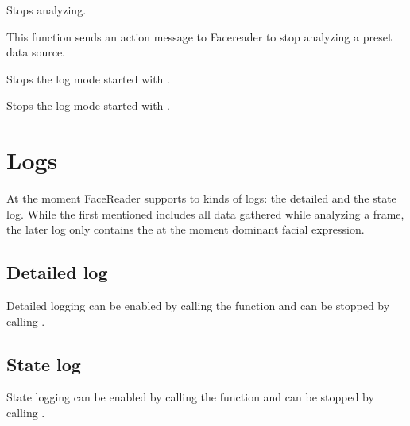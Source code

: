 \documentclass[letterpaper,10pt,english]{sphinxmanual}
\begin{document}
\begin{fulllineitems}

\begin{fulllineitems}
\label{_static/code:FaceReader.FaceReader.stop_analyzing}
Stops analyzing.

This function sends an action message to Facereader to stop analyzing a preset data source.

\end{fulllineitems}


\begin{fulllineitems}
\label{_static/code:FaceReader.FaceReader.stop_detailed_log}
Stops the log mode started with {\hyperref[_static/code:FaceReader.FaceReader.start_detailed_log]{}}.

\end{fulllineitems}


\begin{fulllineitems}
\label{_static/code:FaceReader.FaceReader.stop_state_log}
Stops the log mode started with {\hyperref[_static/code:FaceReader.FaceReader.start_state_log]{}}.

\end{fulllineitems}


\end{fulllineitems}



\section{Logs}
\label{_static/code:logs}
At the moment FaceReader supports to kinds of logs: the detailed and
the state log. While the first mentioned includes all data gathered
while analyzing a frame, the later log only contains the at the moment
dominant facial expression.


\subsection{Detailed log}
\label{_static/code:detailed-log}
Detailed logging can be enabled by calling the function
 and can be stopped by calling
.


\subsection{State log}
\label{_static/code:state-log}
State logging can be enabled by calling the function
 and can be stopped by calling
.



\renewcommand{\indexname}{Index}
\printindex
\end{document}
